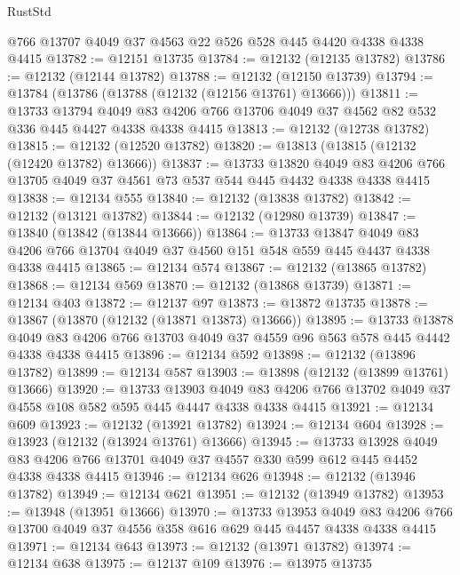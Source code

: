 \begin{lexlean}{RustStd}
\begin{coremodule}
    @766
    @13707
    @4049
    @37
    @4563
    @22
    @526
    @528
    @445
    @4420
    @4338
    @4338
    @4415
@13782 := @12151 @13735
@13784 := @12132 (@12135 @13782)
@13786 := @12132 (@12144 @13782)
@13788 := @12132 (@12150 @13739)
@13794 := @13784 (@13786 (@13788 (@12132 (@12156 @13761) @13666)))
@13811 := @13733
    @13794
    @4049
    @83
    @4206
    @766
    @13706
    @4049
    @37
    @4562
    @82
    @532
    @336
    @445
    @4427
    @4338
    @4338
    @4415
@13813 := @12132 (@12738 @13782)
@13815 := @12132 (@12520 @13782)
@13820 := @13813 (@13815 (@12132 (@12420 @13782) @13666))
@13837 := @13733
    @13820
    @4049
    @83
    @4206
    @766
    @13705
    @4049
    @37
    @4561
    @73
    @537
    @544
    @445
    @4432
    @4338
    @4338
    @4415
@13838 := @12134 @555
@13840 := @12132 (@13838 @13782)
@13842 := @12132 (@13121 @13782)
@13844 := @12132 (@12980 @13739)
@13847 := @13840 (@13842 (@13844 @13666))
@13864 := @13733
    @13847
    @4049
    @83
    @4206
    @766
    @13704
    @4049
    @37
    @4560
    @151
    @548
    @559
    @445
    @4437
    @4338
    @4338
    @4415
@13865 := @12134 @574
@13867 := @12132 (@13865 @13782)
@13868 := @12134 @569
@13870 := @12132 (@13868 @13739)
@13871 := @12134 @403
@13872 := @12137 @97
@13873 := @13872 @13735
@13878 := @13867 (@13870 (@12132 (@13871 @13873) @13666))
@13895 := @13733
    @13878
    @4049
    @83
    @4206
    @766
    @13703
    @4049
    @37
    @4559
    @96
    @563
    @578
    @445
    @4442
    @4338
    @4338
    @4415
@13896 := @12134 @592
@13898 := @12132 (@13896 @13782)
@13899 := @12134 @587
@13903 := @13898 (@12132 (@13899 @13761) @13666)
@13920 := @13733
    @13903
    @4049
    @83
    @4206
    @766
    @13702
    @4049
    @37
    @4558
    @108
    @582
    @595
    @445
    @4447
    @4338
    @4338
    @4415
@13921 := @12134 @609
@13923 := @12132 (@13921 @13782)
@13924 := @12134 @604
@13928 := @13923 (@12132 (@13924 @13761) @13666)
@13945 := @13733
    @13928
    @4049
    @83
    @4206
    @766
    @13701
    @4049
    @37
    @4557
    @330
    @599
    @612
    @445
    @4452
    @4338
    @4338
    @4415
@13946 := @12134 @626
@13948 := @12132 (@13946 @13782)
@13949 := @12134 @621
@13951 := @12132 (@13949 @13782)
@13953 := @13948 (@13951 @13666)
@13970 := @13733
    @13953
    @4049
    @83
    @4206
    @766
    @13700
    @4049
    @37
    @4556
    @358
    @616
    @629
    @445
    @4457
    @4338
    @4338
    @4415
@13971 := @12134 @643
@13973 := @12132 (@13971 @13782)
@13974 := @12134 @638
@13975 := @12137 @109
@13976 := @13975 @13735

\end{coremodule}
\end{lexlean}
